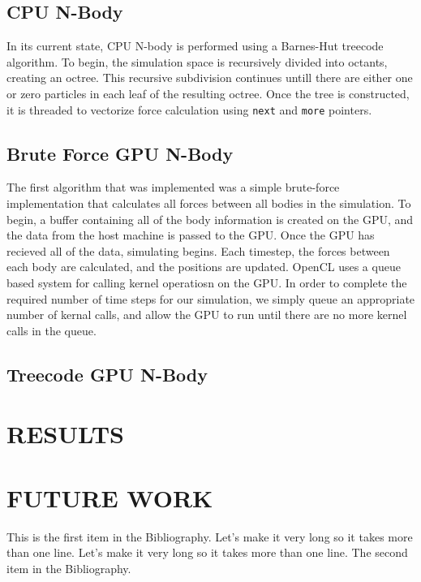 \documentclass{thesis}
\begin{document}
\section{CPU N-Body}
In its current state, CPU N-body is performed using a Barnes-Hut treecode algorithm. To begin, the simulation space is recursively divided into octants, creating an octree. This recursive subdivision continues untill there are either one or zero particles in each leaf of the resulting octree. Once the tree is constructed, it is threaded to vectorize force calculation using \texttt{next} and \texttt{more} pointers. 

\section{Brute Force GPU N-Body}
The first algorithm that was implemented was a simple brute-force implementation that calculates all forces between all bodies in the simulation. To begin, a buffer containing all of the body information is created on the GPU, and the data from the host machine is passed to the GPU. Once the GPU has recieved all of the data, simulating begins. Each timestep, the forces between each body are calculated, and the positions are updated. OpenCL uses a queue based system for calling kernel operatiosn on the GPU. In order to complete the required number of time steps for our simulation, we simply queue an appropriate number of kernal calls, and allow the GPU to run until there are no more kernel calls in the queue.
\section{Treecode GPU N-Body}


\chapter{RESULTS}
\chapter{FUTURE WORK}

\begin{singlespace}
\begin{thebibliography}{99}
 This is the first item in the Bibliography.
Let's make it very long so it takes more than one line.
Let's make it very long so it takes more than one line.
 The second item in the Bibliography.
\end{thebibliography}
\end{singlespace}
\end{document}
